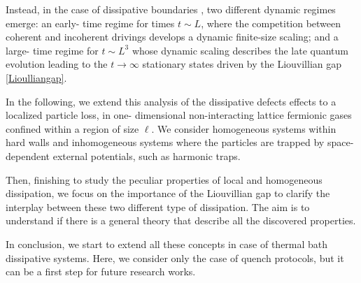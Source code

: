 Instead, in the case of dissipative boundaries 
\cite{TV-2021-dissipativeboundaries}, two different dynamic regimes emerge: an early-
time regime for times $t \sim L$, where the competition between coherent and incoherent drivings
develops a dynamic finite-size scaling; and a large-
time regime for $t \sim L^3$ whose dynamic scaling describes the late quantum evolution leading to the
$t \to \infty$ stationary states driven by the Liouvillian gap \eqref{Lioulliangap}.

In the following, we extend this analysis of the dissipative defects effects to a localized particle loss, in one-
dimensional non-interacting lattice fermionic gases confined within a region of size $\ell$. We consider
homogeneous systems within hard walls and inhomogeneous systems where the particles are trapped
by space-dependent external potentials, such as harmonic traps.

Then, finishing to study the peculiar properties of local and homogeneous dissipation, we focus on the importance
of the Liouvillian gap to clarify the interplay between these two different type of dissipation. The aim is
to understand if there is a general theory that describe all the discovered properties.

In conclusion, we start to extend all these concepts in case of thermal bath dissipative systems. Here, we 
consider only the case of quench protocols, but it can be a first step for future research works. 










